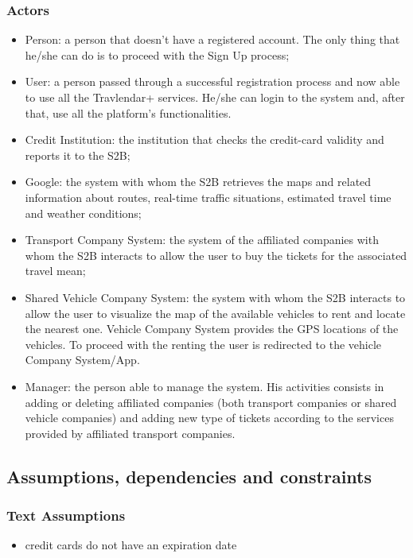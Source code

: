 	\subsubsection{Actors}
			\begin{itemize}
			\item Person: a person that doesn't have a registered account. The only thing that he/she can do is to proceed with the Sign Up process;
			\item User: a person passed through a successful registration process and now
			able to use all the Travlendar+ services. He/she can login to the system and, after that, use all
			the platform's functionalities.
			\item Credit Institution: the institution that checks the credit-card validity and reports it to the S2B;
			\item Google: the system with whom the S2B retrieves the maps and related information about routes, real-time traffic situations, estimated travel time and weather conditions;
			\item Transport Company System: the system of the affiliated companies with whom the S2B interacts to allow the user to buy the tickets for the associated travel mean;
			\item Shared Vehicle Company System: the system with whom the S2B interacts to allow the user to visualize the map of the available vehicles to rent and locate the nearest one. Vehicle Company System provides the GPS locations of the vehicles. To proceed with the renting the user is redirected to the vehicle Company System/App.
			\item Manager: the person able to manage the system. His activities consists in adding or deleting affiliated companies (both  transport companies or shared vehicle companies) and adding new type of tickets according to the services provided by affiliated transport companies.
		\end{itemize}
\subsection{Assumptions, dependencies and constraints}
	\subsubsection{Text Assumptions}
		\begin{itemize}
			\item credit cards do not have an expiration date
		\end{itemize}


